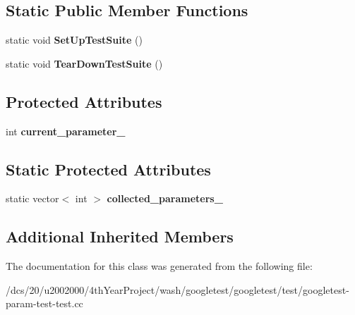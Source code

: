 \subsection*{Static Public Member Functions}
\begin{DoxyCompactItemize}
\item 
\mbox{\label{classTestGenerationTest_a079d02b490a5c802ae9a650dd43293ba}} 
static void {\bfseries Set\+Up\+Test\+Suite} ()
\item 
\mbox{\label{classTestGenerationTest_ac365207087edbdfaa00aeb0f3549a351}} 
static void {\bfseries Tear\+Down\+Test\+Suite} ()
\end{DoxyCompactItemize}
\subsection*{Protected Attributes}
\begin{DoxyCompactItemize}
\item 
\mbox{\label{classTestGenerationTest_a2d149b987b6dfe86ffbfae677199b0cd}} 
int {\bfseries current\+\_\+parameter\+\_\+}
\end{DoxyCompactItemize}
\subsection*{Static Protected Attributes}
\begin{DoxyCompactItemize}
\item 
\mbox{\label{classTestGenerationTest_a16dfa6f4b445c7e4a7a9611b34b7a7a2}} 
static vector$<$ int $>$ {\bfseries collected\+\_\+parameters\+\_\+}
\end{DoxyCompactItemize}
\subsection*{Additional Inherited Members}


The documentation for this class was generated from the following file\+:\begin{DoxyCompactItemize}
\item 
/dcs/20/u2002000/4th\+Year\+Project/wash/googletest/googletest/test/googletest-\/param-\/test-\/test.\+cc\end{DoxyCompactItemize}
